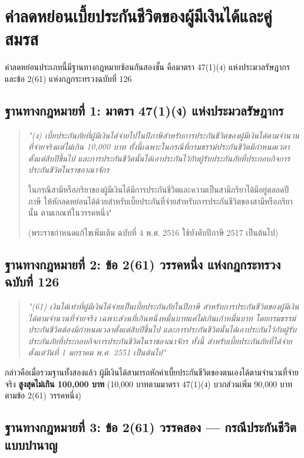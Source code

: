 \documentclass[12pt,a4paper]{article}
\newcommand{\hilight}[1]{\textbf{#1}}
\begin{document}
\newpage
\section{ค่าลดหย่อนเบี้ยประกันชีวิตของผู้มีเงินได้และคู่สมรส}

ค่าลดหย่อนประเภทนี้มีฐานทางกฎหมายซ้อนกันสองชั้น คือมาตรา 47(1)(ง) แห่งประมวลรัษฎากร และข้อ 2(61) แห่งกฎกระทรวงฉบับที่ 126

\subsection*{ฐานทางกฎหมายที่ 1: มาตรา 47(1)(ง) แห่งประมวลรัษฎากร}

\begin{quote}
{\itshape "(ง) เบี้ยประกันภัยที่ผู้มีเงินได้จ่ายไปในปีภาษีสำหรับการประกันชีวิตของผู้มีเงินได้ตามจำนวนที่จ่ายจริงแต่ไม่เกิน 10,000 บาท ทั้งนี้เฉพาะในกรณีที่กรมธรรม์ประกันชีวิตมีกำหนดเวลาตั้งแต่สิบปีขึ้นไป และการประกันชีวิตนั้นได้เอาประกันไว้กับผู้รับประกันภัยที่ประกอบกิจการประกันชีวิตในราชอาณาจักร

ในกรณีสามีหรือภริยาของผู้มีเงินได้มีการประกันชีวิตและความเป็นสามีภริยาได้มีอยู่ตลอดปีภาษี ให้หักลดหย่อนได้ด้วยสำหรับเบี้ยประกันที่จ่ายสำหรับการประกันชีวิตของสามีหรือภริยานั้น ตามเกณฑ์ในวรรคหนึ่ง"} (พระราชกำหนดแก้ไขเพิ่มเติม ฉบับที่ 4 พ.ศ. 2516 ใช้บังคับปีภาษี 2517 เป็นต้นไป)
\end{quote}

\subsection*{ฐานทางกฎหมายที่ 2: ข้อ 2(61) วรรคหนึ่ง แห่งกฎกระทรวงฉบับที่ 126}

\begin{quote}
\textit{"(61) เงินได้เท่าที่ผู้มีเงินได้จ่ายเป็นเบี้ยประกันภัยในปีภาษี สำหรับการประกันชีวิตของผู้มีเงินได้ตามจำนวนที่จ่ายจริง เฉพาะส่วนที่เกินหนึ่งหมื่นบาทแต่ไม่เกินเก้าหมื่นบาท โดยกรมธรรม์ประกันชีวิตต้องมีกำหนดเวลาตั้งแต่สิบปีขึ้นไป และการประกันชีวิตนั้นได้เอาประกันไว้กับผู้รับประกันภัยที่ประกอบกิจการประกันชีวิตในราชอาณาจักร ทั้งนี้ สำหรับเบี้ยประกันภัยที่ได้จ่ายตั้งแต่วันที่ 1 มกราคม พ.ศ. 2551 เป็นต้นไป"}
\end{quote}

กล่าวคือเมื่อรวมฐานทั้งสองแล้ว ผู้มีเงินได้สามารถหักค่าเบี้ยประกันชีวิตของตนเองได้ตามจำนวนที่จ่ายจริง \hilight{สูงสุดไม่เกิน 100,000 บาท} (10,000 บาทตามมาตรา 47(1)(ง) บวกส่วนเพิ่ม 90,000 บาทตามข้อ 2(61) วรรคหนึ่ง)

\subsection*{ฐานทางกฎหมายที่ 3: ข้อ 2(61) วรรคสอง --- กรณีประกันชีวิตแบบบำนาญ}
\end{document}
